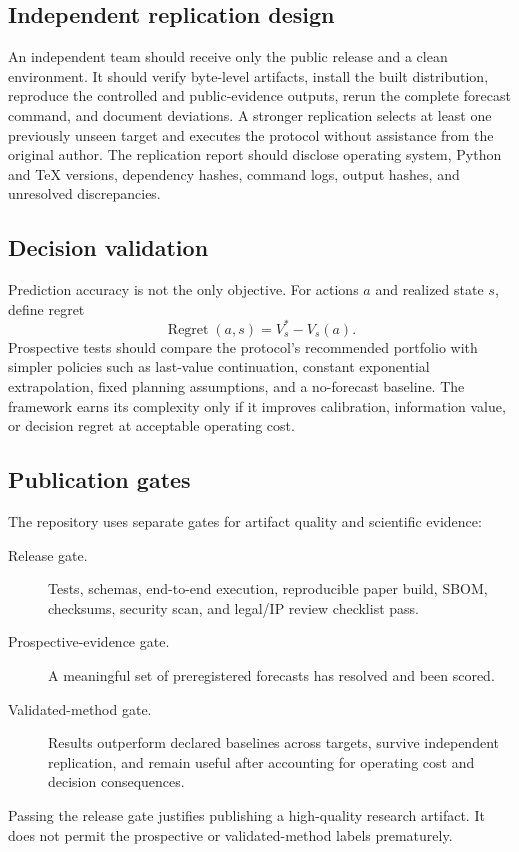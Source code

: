 \subsection{Independent replication design}

An independent team should receive only the public release and a clean environment. It should verify byte-level artifacts, install the built distribution, reproduce the controlled and public-evidence outputs, rerun the complete forecast command, and document deviations. A stronger replication selects at least one previously unseen target and executes the protocol without assistance from the original author. The replication report should disclose operating system, Python and TeX versions, dependency hashes, command logs, output hashes, and unresolved discrepancies.

\subsection{Decision validation}

Prediction accuracy is not the only objective. For actions $a$ and realized state $s$, define regret
\begin{equation}
\operatorname{Regret}(a,s)=V_s^*-V_s(a).
\end{equation}
Prospective tests should compare the protocol's recommended portfolio with simpler policies such as last-value continuation, constant exponential extrapolation, fixed planning assumptions, and a no-forecast baseline. The framework earns its complexity only if it improves calibration, information value, or decision regret at acceptable operating cost.

\subsection{Publication gates}

The repository uses separate gates for artifact quality and scientific evidence:
\begin{description}
\item[Release gate.] Tests, schemas, end-to-end execution, reproducible paper build, SBOM, checksums, security scan, and legal/IP review checklist pass.
\item[Prospective-evidence gate.] A meaningful set of preregistered forecasts has resolved and been scored.
\item[Validated-method gate.] Results outperform declared baselines across targets, survive independent replication, and remain useful after accounting for operating cost and decision consequences.
\end{description}
Passing the release gate justifies publishing a high-quality research artifact. It does not permit the prospective or validated-method labels prematurely.

